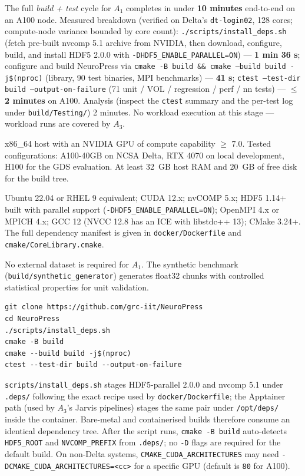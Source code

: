 \documentclass[conference]{IEEEtran}
\begin{document}
\arttime
The full \emph{build + test} cycle for $A_1$ completes in
under \textbf{10 minutes} end-to-end on an A100 node. Measured
breakdown (verified on Delta's \texttt{dt-login02}, 128 cores;
compute-node variance bounded by core count):
\texttt{./scripts/install\_deps.sh} (fetch pre-built nvcomp
5.1 archive from NVIDIA, then download, configure, build, and
install HDF5 2.0.0 with
\texttt{-DHDF5\_ENABLE\_PARALLEL=ON}) --- \textbf{1 min 36 s};
configure and build NeuroPress via
\texttt{cmake -B build \&\& cmake --build build -j\$(nproc)}
(library, 90 test binaries, MPI benchmarks)
--- \textbf{41 s};
\texttt{ctest --test-dir build --output-on-failure} (71 unit
/ VOL / regression / perf / nn tests) --- \textbf{$\le$ 2
minutes} on A100. Analysis (inspect the
\texttt{ctest} summary and the per-test log under
\texttt{build/Testing/}) 2 minutes. No workload execution at
this stage --- workload runs are covered by $A_3$.

\artin

x86\_64 host with an NVIDIA GPU of compute capability $\geq$
7.0. Tested configurations: A100-40GB on NCSA Delta, RTX 4070 on
local development, H100 for the GDS evaluation. At least 32~GB
host RAM and 20~GB of free disk for the build tree.

Ubuntu 22.04 or RHEL 9 equivalent; CUDA 12.x; nvCOMP 5.x;
HDF5 1.14+ built with parallel support
(\texttt{-DHDF5\_ENABLE\_PARALLEL=ON}); OpenMPI 4.x or MPICH
4.x; GCC 12 (NVCC 12.8 has an ICE with libstdc++ 13); CMake
3.24+. The full dependency manifest is given in
\texttt{docker/Dockerfile} and
\texttt{cmake/CoreLibrary.cmake}.

No external dataset is required for $A_1$. The synthetic
benchmark (\texttt{build/synthetic\_generator})
generates float32 chunks with controlled statistical properties
for unit validation.

\begin{verbatim}
git clone https://github.com/grc-iit/NeuroPress
cd NeuroPress
./scripts/install_deps.sh
cmake -B build
cmake --build build -j$(nproc)
ctest --test-dir build --output-on-failure
\end{verbatim}
\texttt{scripts/install\_deps.sh} stages HDF5-parallel 2.0.0
and nvcomp 5.1 under \texttt{.deps/} following the exact
recipe used by \texttt{docker/Dockerfile}; the Apptainer path
(used by $A_3$'s Jarvis pipelines) stages the same pair under
\texttt{/opt/deps/} inside the container. Bare-metal and
containerised builds therefore consume an identical dependency
tree. After the script runs, \texttt{cmake -B build}
auto-detects \texttt{HDF5\_ROOT} and \texttt{NVCOMP\_PREFIX}
from \texttt{.deps/}; no \texttt{-D} flags are required for
the default build. On non-Delta systems,
\texttt{CMAKE\_CUDA\_ARCHITECTURES} may need
\texttt{-DCMAKE\_CUDA\_ARCHITECTURES=<cc>} for a specific GPU
(default is \texttt{80} for A100).
\end{document}
